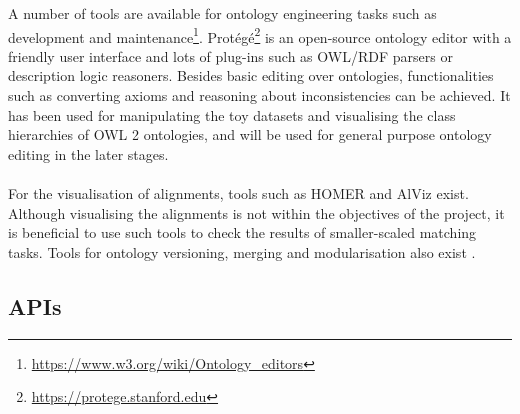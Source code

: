 A number of tools are available for ontology engineering tasks such as development and maintenance\footnote{\url{https://www.w3.org/wiki/Ontology_editors}}. Protégé\footnote{\url{https://protege.stanford.edu}} \cite{DBLP:journals/aimatters/Musen15} is an open-source ontology editor with a friendly user interface and lots of plug-ins such as OWL/RDF parsers or description logic reasoners. Besides basic editing over ontologies, functionalities such as converting axioms and reasoning about inconsistencies can be achieved. It has been used for manipulating the toy datasets and visualising the class hierarchies of OWL 2 ontologies, and will be used for general purpose ontology editing in the later stages.
\\\\
For the visualisation of alignments, tools such as HOMER and AlViz \cite{DBLP:conf/iv/LanzenbergerS06} exist. Although visualising the alignments is not within the objectives of the project, it is beneficial to use such tools to check the results of smaller-scaled matching tasks. Tools for ontology versioning, merging and modularisation also exist \cite{DBLP:conf/ecai/Jimenez-RuizGZH12}.

\subsection{APIs}

